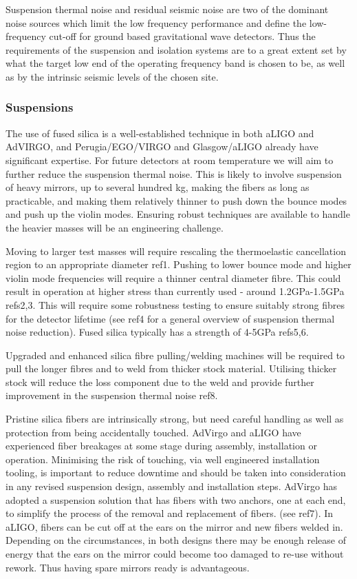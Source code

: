 Suspension thermal noise and residual seismic noise are two of the dominant noise sources which limit the low frequency performance and define the low-frequency cut-off for ground based gravitational wave detectors. Thus the requirements of the suspension and isolation systems are to a great extent set by what the target low end of the operating frequency band is chosen to be, as well as by the intrinsic seismic levels of the chosen site.

\subsubsection{Suspensions}

The use of fused silica is a well-established technique in both aLIGO and AdVIRGO,  and Perugia/EGO/VIRGO and Glasgow/aLIGO already have significant expertise. For future detectors at room temperature  we will aim to further reduce the suspension thermal noise. This is likely to involve suspension of heavy mirrors, up to several hundred kg, making the fibers as long as practicable, and making them relatively thinner to push down the bounce modes and push up the violin modes.  Ensuring robust techniques are available to handle the heavier masses will be an engineering challenge.
 
Moving to larger test masses will require rescaling the thermoelastic cancellation region to an appropriate diameter ref1. Pushing to lower bounce mode and higher violin mode frequencies will require a thinner central diameter fibre. This could result in operation at higher stress than currently used - around 1.2GPa-1.5GPa refs2,3. This will require some robustness testing to ensure suitably strong fibres for the detector lifetime (see ref4 for a general overview of suspension thermal noise reduction). Fused silica typically has a strength of 4-5GPa refs5,6.

Upgraded and enhanced silica fibre pulling/welding machines will be required to  pull the longer fibres and to weld from thicker stock material. Utilising thicker stock will reduce the loss component due to the weld and provide further improvement in the suspension thermal noise ref8. 

Pristine silica fibers are intrinsically strong, but need careful handling as well as protection from being accidentally touched. AdVirgo and aLIGO have experienced fiber breakages at some stage during assembly, installation or operation. Minimising the risk of touching, via well engineered installation tooling, is important to reduce downtime and should be taken into consideration in any revised suspension design, assembly and installation steps. AdVirgo has adopted a suspension solution that has fibers with two anchors, one at each end, to simplify the process of the removal and replacement of fibers. (see ref7). In aLIGO, fibers can be cut off at the ears on the mirror and new fibers welded in. Depending on the circumstances, in both designs there may be enough release of energy that the ears on the mirror could become too damaged to re-use without rework. Thus having spare mirrors ready is advantageous. 

